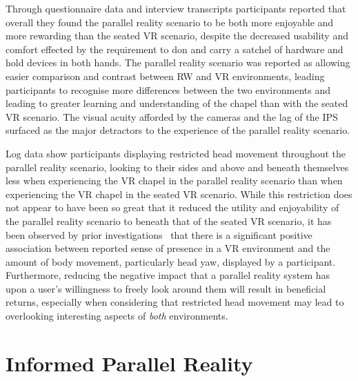 Through questionnaire data and interview transcripts participants reported that overall they found the parallel reality scenario to be both more enjoyable and more rewarding than the seated VR scenario, despite the decreased usability and comfort effected by the requirement to don and carry a satchel of hardware and hold devices in both hands. The parallel reality scenario was reported as allowing easier comparison and contrast between RW and VR environments, leading participants to recognise more differences between the two environments and leading to greater learning and understanding of the chapel than with the seated VR scenario. The visual acuity afforded by the cameras and the lag of the IPS surfaced as the major detractors to the experience of the parallel reality scenario.

Log data show participants displaying restricted head movement throughout the parallel reality scenario, looking to their sides and above and beneath themselves less when experiencing the VR chapel in the parallel reality scenario than when experiencing the VR chapel in the seated VR scenario. While this restriction does not appear to have been so great that it reduced the utility and enjoyability of the parallel reality scenario to beneath that of the seated VR scenario, it has been observed by prior investigations~\cite{Slater1998} that there is a significant positive association between reported sense of presence in a VR environment and the amount of body movement, particularly head yaw, displayed by a participant. Furthermore, reducing the negative impact that a parallel reality system has upon a user's willingness to freely look around them will result in beneficial returns, especially when considering that restricted head movement may lead to overlooking interesting aspects of \textit{both} environments.



\chapter{Informed Parallel Reality}

